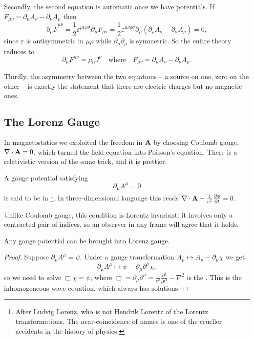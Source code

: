 \documentclass[a4paper]{scrartcl}
\begin{document}
Secondly, the second equation is automatic once we have potentials. If $F_{\mu\nu} = \partial_\mu A_\nu - \partial_\nu A_\mu$ then
$$
\partial_\mu \tilde F^{\mu\nu} = \frac{1}{2}\varepsilon^{\mu\nu\rho\sigma}\partial_\mu F_{\rho\sigma} = \frac{1}{2}\varepsilon^{\mu\nu\rho\sigma}\partial_\mu(\partial_\rho A_\sigma - \partial_\sigma A_\rho) = 0,
$$
since $\varepsilon$ is antisymmetric in $\mu\rho$ while $\partial_\mu\partial_\rho$ is symmetric. So the entire theory reduces to
$$
\partial_\mu F^{\mu\nu} = \mu_0 J^\nu \quad \text{where}\quad F_{\mu\nu} = \partial_\mu A_\nu - \partial_\nu A_\mu.
$$

Thirdly, the asymmetry between the two equations -- a source on one, zero on the other -- is exactly the statement that there are electric charges but no magnetic ones.

\subsection{The Lorenz Gauge}

In magnetostatics we exploited the freedom in $\mathbf{A}$ by choosing Coulomb gauge, $\nabla\cdot\mathbf{A} = 0$, which turned the field equation into Poisson's equation. There is a relativistic version of the same trick, and it is prettier.

\begin{definition}
	A gauge potential satisfying
	$$
	\partial_\mu A^\mu = 0
	$$
	is said to be in \footnote{After Ludvig Lorenz, who is not Hendrik Lorentz of the Lorentz transformations. The near-coincidence of names is one of the crueller accidents in the history of physics.}. In three-dimensional language this reads $\nabla\cdot\mathbf{A} + \frac{1}{c^2}\frac{\partial \phi}{\partial t} = 0$.
\end{definition}

Unlike Coulomb gauge, this condition is Lorentz invariant: it involves only a contracted pair of indices, so an observer in any frame will agree that it holds.

\begin{proposition}
	Any gauge potential can be brought into Lorenz gauge.
\end{proposition}
\begin{proof}
	Suppose $\partial_\mu A^\mu = \psi$. Under a gauge transformation $A_\mu \mapsto A_\mu - \partial_\mu \chi$ we get
	$$
	\partial_\mu A^\mu \mapsto \psi - \partial_\mu \partial^\mu \chi,
	$$
	so we need to solve $\Box \chi = \psi$, where $\Box = \partial_\mu\partial^\mu = \frac{1}{c^2}\frac{\partial^2}{\partial t^2} - \nabla^2$ is the . This is the inhomogeneous wave equation, which always has solutions.
\end{proof}
\end{document}
